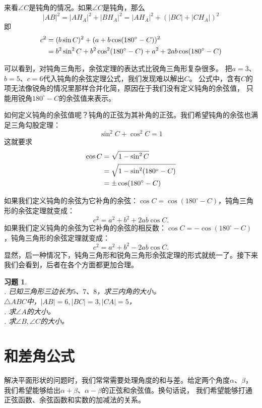 \documentclass[12pt,UTF8]{ctexbook}
\newtheorem{xt}{习题}[section]
\begin{document}
来看$\angle C$是钝角的情况。如果$\angle C$是钝角，那么
$$ |AB|^2 = |AH_A|^2 + |BH_A|^2 = |AH_A|^2 + (|BC| + |CH_A|)^2$$
即
\begin{align}
    c^2 &= (b\sin C)^2 + (a + b\cos (180^\circ - C))^2 \notag \\
    &= b^2\sin^2 C + b^2\cos^2 (180^\circ - C) + a^2 + 2ab\cos (180^\circ - C) \notag
\end{align}

可以看到，对钝角三角形，余弦定理的表达式比锐角三角形复杂很多。
把$a=3$、$b=5$、$c=6$代入钝角的余弦定理公式，我们发现难以解出$C$。
公式中，含有$C$的项无法像锐角的情况里那样合并化简，原因在于我们没有定义钝角的余弦值，
只能用锐角$180^\circ - C$的余弦值来表示。

如何定义钝角的余弦值呢？钝角的正弦为其补角的正弦。我们希望钝角的余弦也满足三角勾股定理：
$$ \sin^2 C +  \cos^2 C = 1 $$
这就要求
\begin{align}
    \cos C &= \sqrt{1 - \sin^2 C} \notag \\
    &= \sqrt{1 - \sin^2 (180^\circ - C)} \notag \\
    &= \pm\cos (180^\circ - C) \notag
\end{align}

如果我们定义钝角的余弦为它补角的余弦：$ \cos C = \cos (180^\circ - C)$，钝角三角形的余弦定理就变成：
$$ c^2 = a^2 + b^2 + 2ab \cos C.$$
如果我们定义钝角的余弦为它补角的余弦的相反数：$ \cos C = -\cos (180^\circ - C)$，钝角三角形的余弦定理就变成：
$$ c^2 = a^2 + b^2 - 2ab \cos C.$$
显然，后一种情况下，钝角三角形和锐角三角形余弦定理的形式就统一了。接下来我们会看到，后者在各个方面都更加合理。

\begin{xt}
    \mbox{}\\
    . 已知三角形三边长为$5$、$7$、$8$，求三内角的大小。\\
    $\triangle ABC$中，$|AB|=6,|BC|=3,|CA|=5$，\\
    . 求$\angle A$的大小。\\
    . 求$\angle B, \angle C$的大小。
\end{xt}

\section{和差角公式}

解决平面形状的问题时，我们常常需要处理角度的和与差。给定两个角度$\alpha$、$\beta$，
我们希望能够给出$\alpha + \beta$、$\alpha - \beta$的正弦和余弦值。换句话说，
我们希望能够打通正弦函数、余弦函数和实数的加减法的关系。
\end{document}
